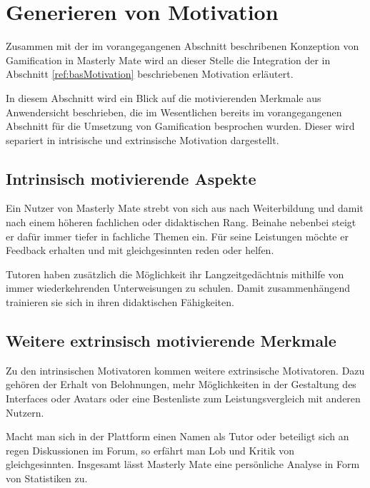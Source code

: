 \section{Generieren von Motivation}
Zusammen mit der im vorangegangenen Abschnitt beschribenen Konzeption von
Gamification in Masterly Mate wird an dieser Stelle die Integration der in
Abschnitt \ref{ref:basMotivation} beschriebenen Motivation erläutert.

In diesem Abschnitt wird ein Blick auf die motivierenden Merkmale aus
Anwendersicht beschrieben, die im Wesentlichen bereits im vorangegangenen
Abschnitt für die Umsetzung von Gamification besprochen wurden. Dieser wird
separiert in intrisische und extrinsische Motivation dargestellt.

\subsection{Intrinsisch motivierende Aspekte}
Ein Nutzer von Masterly Mate strebt von sich aus nach Weiterbildung und damit
nach einem höheren fachlichen oder didaktischen Rang. Beinahe nebenbei steigt er
dafür immer tiefer in fachliche Themen ein. Für seine Leistungen möchte er
Feedback erhalten und mit gleichgesinnten reden oder helfen. 

Tutoren haben zusätzlich die Möglichkeit ihr Langzeitgedächtnis mithilfe von
immer wiederkehrenden Unterweisungen zu schulen. Damit zusammenhängend
trainieren sie sich in ihren didaktischen Fähigkeiten.
  
\subsection{Weitere extrinsisch motivierende Merkmale}
Zu den intrinsischen Motivatoren kommen weitere extrinsische Motivatoren. Dazu
gehören der Erhalt von Belohnungen, mehr Möglichkeiten in der Gestaltung des
Interfaces oder Avatars oder eine Bestenliste zum Leistungsvergleich mit anderen
Nutzern.

Macht man sich in der Plattform einen Namen als Tutor oder beteiligt sich an
regen Diskussionen im Forum, so erfährt man Lob und Kritik von gleichgesinnten.
Insgesamt lässt Masterly Mate eine persönliche Analyse in Form von Statistiken
zu.